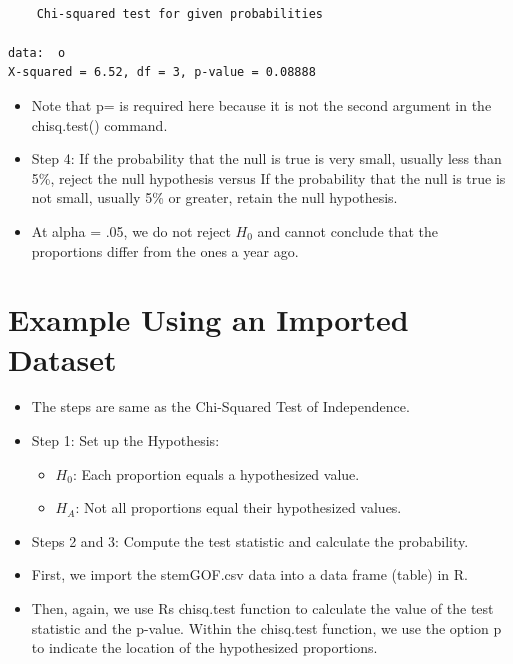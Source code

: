 \documentclass[
  letterpaper,
  DIV=11,
  numbers=noendperiod]{scrreprt}
\providecommand{\tightlist}{%
  \setlength{\itemsep}{0pt}\setlength{\parskip}{0pt}}\usepackage{longtable,booktabs,array}
\begin{document}
\begin{verbatim}

    Chi-squared test for given probabilities

data:  o
X-squared = 6.52, df = 3, p-value = 0.08888
\end{verbatim}

\begin{itemize}
\item
  Note that p= is required here because it is not the second argument in
  the chisq.test() command.
\item
  Step 4: If the probability that the null is true is very small,
  usually less than 5\%, reject the null hypothesis versus If the
  probability that the null is true is not small, usually 5\% or
  greater, retain the null hypothesis.
\item
  At alpha = .05, we do not reject \(H_0\) and cannot conclude that the
  proportions differ from the ones a year ago.
\end{itemize}

\section{Example Using an Imported
Dataset}\label{example-using-an-imported-dataset-1}

\begin{itemize}
\tightlist
\item
  The steps are same as the Chi-Squared Test of Independence.
\item
  Step 1: Set up the Hypothesis:

  \begin{itemize}
  \tightlist
  \item
    \(𝐻_0\): Each proportion equals a hypothesized value.
  \item
    \(𝐻_A\): Not all proportions equal their hypothesized values.
  \end{itemize}
\item
  Steps 2 and 3: Compute the test statistic and calculate the
  probability.
\item
  First, we import the stemGOF.csv data into a data frame (table) in R.
\item
  Then, again, we use Rs chisq.test function to calculate the value of
  the test statistic and the p-value. Within the chisq.test function, we
  use the option p to indicate the location of the hypothesized
  proportions.
\end{itemize}
\end{document}
